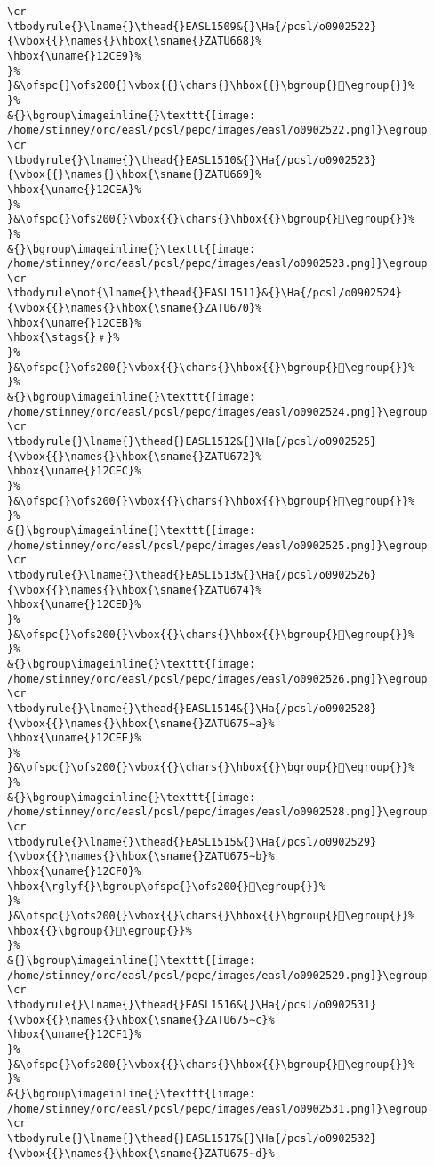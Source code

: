 \begin{verbatim}
\cr
\tbodyrule{}\lname{}\thead{}EASL1509&{}\Ha{/pcsl/o0902522}{\vbox{{}\names{}\hbox{\sname{}ZATU668}%
\hbox{\uname{}12CE9}%
}%
}&\ofspc{}\ofs200{}\vbox{{}\chars{}\hbox{{}\bgroup{}𒳩\egroup{}}%
}%
&{}\bgroup\imageinline{}\texttt{[image: /home/stinney/orc/easl/pcsl/pepc/images/easl/o0902522.png]}\egroup
\cr
\tbodyrule{}\lname{}\thead{}EASL1510&{}\Ha{/pcsl/o0902523}{\vbox{{}\names{}\hbox{\sname{}ZATU669}%
\hbox{\uname{}12CEA}%
}%
}&\ofspc{}\ofs200{}\vbox{{}\chars{}\hbox{{}\bgroup{}𒳪\egroup{}}%
}%
&{}\bgroup\imageinline{}\texttt{[image: /home/stinney/orc/easl/pcsl/pepc/images/easl/o0902523.png]}\egroup
\cr
\tbodyrule\not{\lname{}\thead{}EASL1511}&{}\Ha{/pcsl/o0902524}{\vbox{{}\names{}\hbox{\sname{}ZATU670}%
\hbox{\uname{}12CEB}%
\hbox{\stags{}﹟}%
}%
}&\ofspc{}\ofs200{}\vbox{{}\chars{}\hbox{{}\bgroup{}𒳫\egroup{}}%
}%
&{}\bgroup\imageinline{}\texttt{[image: /home/stinney/orc/easl/pcsl/pepc/images/easl/o0902524.png]}\egroup
\cr
\tbodyrule{}\lname{}\thead{}EASL1512&{}\Ha{/pcsl/o0902525}{\vbox{{}\names{}\hbox{\sname{}ZATU672}%
\hbox{\uname{}12CEC}%
}%
}&\ofspc{}\ofs200{}\vbox{{}\chars{}\hbox{{}\bgroup{}𒳬\egroup{}}%
}%
&{}\bgroup\imageinline{}\texttt{[image: /home/stinney/orc/easl/pcsl/pepc/images/easl/o0902525.png]}\egroup
\cr
\tbodyrule{}\lname{}\thead{}EASL1513&{}\Ha{/pcsl/o0902526}{\vbox{{}\names{}\hbox{\sname{}ZATU674}%
\hbox{\uname{}12CED}%
}%
}&\ofspc{}\ofs200{}\vbox{{}\chars{}\hbox{{}\bgroup{}𒳭\egroup{}}%
}%
&{}\bgroup\imageinline{}\texttt{[image: /home/stinney/orc/easl/pcsl/pepc/images/easl/o0902526.png]}\egroup
\cr
\tbodyrule{}\lname{}\thead{}EASL1514&{}\Ha{/pcsl/o0902528}{\vbox{{}\names{}\hbox{\sname{}ZATU675∼a}%
\hbox{\uname{}12CEE}%
}%
}&\ofspc{}\ofs200{}\vbox{{}\chars{}\hbox{{}\bgroup{}𒳮\egroup{}}%
}%
&{}\bgroup\imageinline{}\texttt{[image: /home/stinney/orc/easl/pcsl/pepc/images/easl/o0902528.png]}\egroup
\cr
\tbodyrule{}\lname{}\thead{}EASL1515&{}\Ha{/pcsl/o0902529}{\vbox{{}\names{}\hbox{\sname{}ZATU675∼b}%
\hbox{\uname{}12CF0}%
\hbox{\rglyf{}\bgroup\ofspc{}\ofs200{}𒳰\egroup{}}%
}%
}&\ofspc{}\ofs200{}\vbox{{}\chars{}\hbox{{}\bgroup{}𒳯\egroup{}}%
\hbox{{}\bgroup{}𒳰\egroup{}}%
}%
&{}\bgroup\imageinline{}\texttt{[image: /home/stinney/orc/easl/pcsl/pepc/images/easl/o0902529.png]}\egroup
\cr
\tbodyrule{}\lname{}\thead{}EASL1516&{}\Ha{/pcsl/o0902531}{\vbox{{}\names{}\hbox{\sname{}ZATU675∼c}%
\hbox{\uname{}12CF1}%
}%
}&\ofspc{}\ofs200{}\vbox{{}\chars{}\hbox{{}\bgroup{}𒳱\egroup{}}%
}%
&{}\bgroup\imageinline{}\texttt{[image: /home/stinney/orc/easl/pcsl/pepc/images/easl/o0902531.png]}\egroup
\cr
\tbodyrule{}\lname{}\thead{}EASL1517&{}\Ha{/pcsl/o0902532}{\vbox{{}\names{}\hbox{\sname{}ZATU675∼d}%

\end{verbatim}
